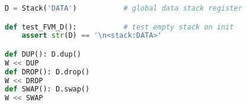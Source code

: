 \clearpage{}\label{Dstack}

\begin{lstlisting}[language=Python]
D = Stack('DATA')			# global data stack register

def test_FVM_D():			# test empty stack on init
	assert str(D) == '\n<stack:DATA>'

def DUP(): D.dup()
W << DUP
def DROP(): D.drop()
W << DROP
def SWAP(): D.swap()
W << SWAP
\end{lstlisting}

